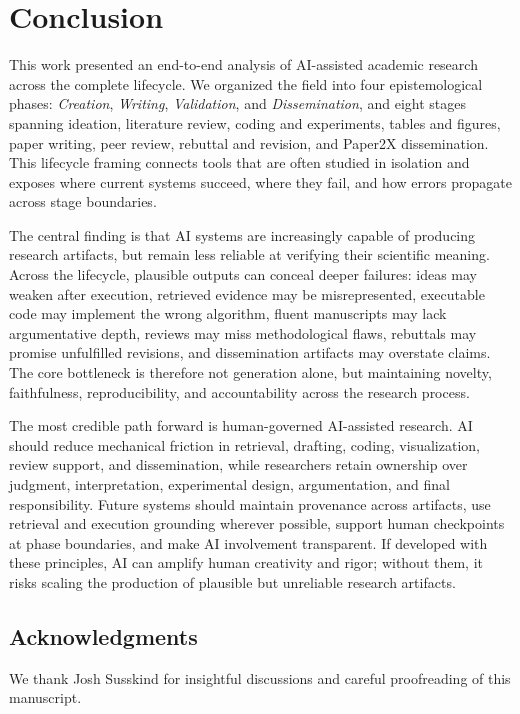 \section{Conclusion}
\label{sec:conclusion}

This work presented an end-to-end analysis of AI-assisted academic research across the complete lifecycle. We organized the field into four epistemological phases: \emph{Creation}, \emph{Writing}, \emph{Validation}, and \emph{Dissemination}, and eight stages spanning ideation, literature review, coding and experiments, tables and figures, paper writing, peer review, rebuttal and revision, and Paper2X dissemination. This lifecycle framing connects tools that are often studied in isolation and exposes where current systems succeed, where they fail, and how errors propagate across stage boundaries.

The central finding is that AI systems are increasingly capable of producing research artifacts, but remain less reliable at verifying their scientific meaning. Across the lifecycle, plausible outputs can conceal deeper failures: ideas may weaken after execution, retrieved evidence may be misrepresented, executable code may implement the wrong algorithm, fluent manuscripts may lack argumentative depth, reviews may miss methodological flaws, rebuttals may promise unfulfilled revisions, and dissemination artifacts may overstate claims. The core bottleneck is therefore not generation alone, but maintaining novelty, faithfulness, reproducibility, and accountability across the research process.

The most credible path forward is human-governed AI-assisted research. AI should reduce mechanical friction in retrieval, drafting, coding, visualization, review support, and dissemination, while researchers retain ownership over judgment, interpretation, experimental design, argumentation, and final responsibility. Future systems should maintain provenance across artifacts, use retrieval and execution grounding wherever possible, support human checkpoints at phase boundaries, and make AI involvement transparent. If developed with these principles, AI can amplify human creativity and rigor; without them, it risks scaling the production of plausible but unreliable research artifacts.


\subsection*{Acknowledgments}
We thank Josh Susskind for insightful discussions and careful proofreading of this manuscript. 

